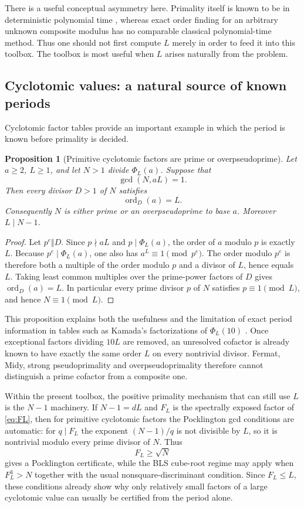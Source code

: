\documentclass[11pt]{article}
\newtheorem{proposition}[theorem]{Proposition}
\newcommand{\ord}{\operatorname{ord}}
\begin{document}
There is a useful conceptual asymmetry here.  Primality itself is known to be
in deterministic polynomial time \cite{AKS2004}, whereas exact order finding for an arbitrary
unknown composite modulus has no comparable classical polynomial-time method.
Thus one should not first compute $L$ merely in order to feed it into this
toolbox.  The toolbox is most useful when $L$ arises naturally from the
problem.

\subsection{Cyclotomic values: a natural source of known periods}
\label{subsec:cyclotomic-known-L}

Cyclotomic factor tables provide an important example in which the period is
known before primality is decided.

\begin{proposition}[Primitive cyclotomic factors are prime or overpseudoprime]
\label{prop:cyclotomic-over}
Let $a\ge2$, $L\ge1$, and let $N>1$ divide $\Phi_L(a)$.  Suppose that
\[
\gcd(N,aL)=1.
\]
Then every divisor $D>1$ of $N$ satisfies
\[
\ord_D(a)=L.
\]
Consequently $N$ is either prime or an overpseudoprime to base $a$.
Moreover $L\mid N-1$.
\end{proposition}

\begin{proof}
Let $p^e\Vert D$.  Since $p\nmid aL$ and $p\mid\Phi_L(a)$, the order of
$a$ modulo $p$ is exactly $L$.  Because $p^e\mid\Phi_L(a)$, one also has
$a^L\equiv1\pmod{p^e}$.  The order modulo $p^e$ is therefore both a
multiple of the order modulo $p$ and a divisor of $L$, hence equals $L$.
Taking least common multiples over the prime-power factors of $D$ gives
$\ord_D(a)=L$.  In particular every prime divisor $p$ of $N$ satisfies
$p\equiv1\pmod L$, and hence $N\equiv1\pmod L$.
\end{proof}

This proposition explains both the usefulness and the limitation of exact
period information in tables such as Kamada's factorizations of
$\Phi_L(10)$ \cite{KamadaPhi10}.  Once exceptional factors dividing $10L$
are removed, an unresolved cofactor is already known to have exactly the
same order $L$ on every nontrivial divisor.  Fermat, Midy, strong
pseudoprimality and overpseudoprimality therefore cannot distinguish a prime
cofactor from a composite one.

Within the present toolbox, the positive primality mechanism that can still
use $L$ is the $N-1$ machinery.  If $N-1=dL$ and $F_L$ is the spectrally
exposed factor of \eqref{eq:FL}, then for primitive cyclotomic factors the
Pocklington gcd conditions are automatic: for $q\mid F_L$ the exponent
$(N-1)/q$ is not divisible by $L$, so it is nontrivial modulo every prime
divisor of $N$.  Thus
\[
F_L\ge\sqrt N
\]
gives a Pocklington certificate, while the BLS cube-root regime may apply
when $F_L^3>N$ together with the usual nonsquare-discriminant condition.
Since $F_L\le L$, these conditions already show why only relatively small
factors of a large cyclotomic value can usually be certified from the period
alone.
\end{document}
